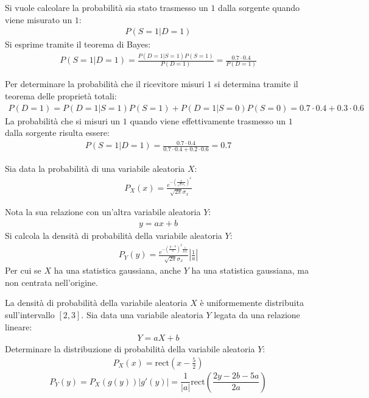 \documentclass{article}
\newcommand{\rect}{\mathrm{rect}}
\begin{document}
Si vuole calcolare la probabilità sia stato trasmesso un $1$ dalla sorgente quando viene misurato un $1$:
\begin{gather*}
    P(S=1|D=1)
\end{gather*}
Si esprime tramite il teorema di Bayes:
\begin{gather*}
    P(S=1|D=1)=\displaystyle\frac{P(D=1|S=1)P(S=1)}{P(D=1)}=\frac{0.7\cdot0.4}{P(D=1)}
\end{gather*}

Per determinare la probabilità che il ricevitore misuri $1$ si determina tramite il teorema delle proprietà totali:
\begin{gather*}
    P(D=1)=P(D=1|S=1)P(S=1)+P(D=1|S=0)P(S=0)=0.7\cdot0.4+0.3\cdot0.6
\end{gather*}
La probabilità che si misuri un $1$ quando viene effettivamente trasmesso un $1$ dalla sorgente risulta essere:
\begin{gather}
    P(S=1|D=1)=\displaystyle\frac{0.7\cdot0.4}{0.7\cdot0.4+0.2\cdot0.6}=0.7
\end{gather}


Sia data la probabilità di una variabile aleatoria $X$:
\begin{gather*}
    P_X(x)=\displaystyle\frac{e^{-\left(\frac{x}{\sqrt{2}{\sigma_x}}\right)^2}}{\sqrt{2\pi}\sigma_x}
\end{gather*}

Nota la sua relazione con un'altra variabile aleatoria $Y$:
\begin{gather*}
    y=ax+b
\end{gather*}
Si calcola la densità di probabilità della variabile aleatoria $Y$:
\begin{gather}
    P_Y(y)=\displaystyle\frac{e^{-\left(\frac{y-b}{a}\right)^2\frac{1}{2\sigma_x^2}}}{\sqrt{2\pi}\sigma_x}\left|\frac{1}{a}\right|
\end{gather}
Per cui se $X$ ha una statistica gaussiana, anche $Y$ ha una statistica gaussiana, ma non centrata nell'origine. 



La densità di probabilità della variabile aleatoria $X$ è uniformemente distribuita sull'intervallo $[2,3]$. Sia data una variabile aleatoria $Y$ legata da una relazione 
lineare:
\begin{gather*}
    Y=aX+b
\end{gather*}
Determinare la distribuzione di probabilità della variabile aleatoria $Y$:
\begin{gather*}
    P_X(x)=\rect\left(x-\displaystyle\frac{5}{2}\right)
\end{gather*}
\begin{equation}
    P_Y(y)=P_X(g(y))|g'(y)|=\displaystyle\frac{1}{|a|}\rect\left(\frac{2y-2b-5a}{2a}\right)
\end{equation}
\end{document}
